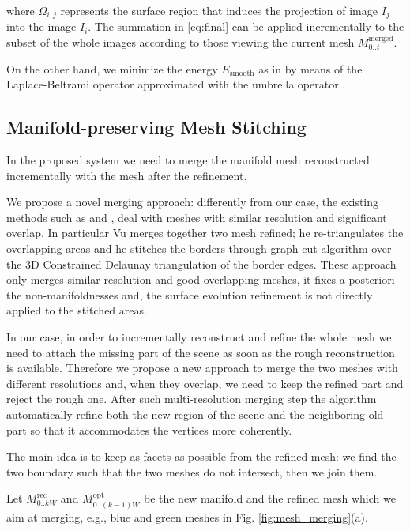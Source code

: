 where $\Omega_{i,j}$ represents the surface region that induces the projection of image $I_j$ into the image $I_i$.
The summation in \eqref{eq:final} can be applied incrementally to the subset of the whole images according to those viewing the current mesh $M_{0..t}^{\text{merged}}$.

On the other hand, we minimize the energy $E_{\textrm{smooth}}$ as in \cite{vu_et_al_2012} by means of the Laplace-Beltrami operator approximated with the umbrella operator \cite{wardetzky2007discrete}.



\subsection{Manifold-preserving Mesh Stitching}
\label{sec:Mesh_merging}
In the proposed system we need to merge the manifold mesh reconstructed incrementally with the mesh after the refinement.

We propose a novel merging approach: differently from our case, the existing methods such as \cite{turk1994zippered} and \cite{VuPhD011},  deal with meshes with similar resolution and significant overlap. 
In particular  Vu  \cite{VuPhD011} merges together two mesh refined; he re-triangulates the overlapping areas and he stitches the borders through graph cut-algorithm over the 3D Constrained Delaunay triangulation of the border edges.
These approach only merges similar resolution and good overlapping meshes, it fixes a-posteriori the non-manifoldnesses and, the surface evolution refinement is not directly applied to the stitched areas.


In our case, in order to incrementally reconstruct and refine the whole mesh we need to attach the missing part of the scene as soon as the rough reconstruction is available. Therefore we propose a new approach to merge the two meshes with  different resolutions and, when they overlap, we need to keep the refined part and reject the rough one.
After such multi-resolution merging step the algorithm automatically refine both the new region of the scene and the neighboring old part so that it accommodates the vertices more coherently.


The main idea is to keep as facets as possible from the refined mesh: we find the two boundary such that the two meshes do not intersect, then we join them.

Let $\mathit{M}_{0..kW}^{\text{rec}}$ and  $\mathit{M}_{0..(k-1)W}^{\text{opt}}$ be the new manifold and the refined mesh which we aim at merging, e.g., blue and green meshes in Fig. \ref{fig:mesh_merging}(a).


